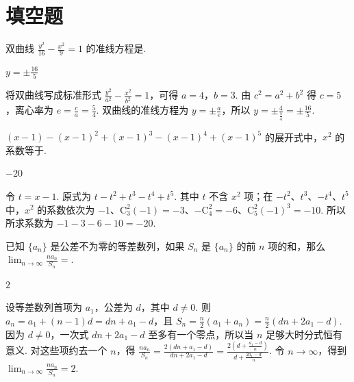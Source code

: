 \section{填空题}

\begin{problem}
双曲线 \(\frac{y^2}{16}-\frac{x^2}{9}=1\) 的准线方程是\fillinblank{}.
\end{problem}

\begin{answer}
\(y=\pm\frac{16}{5}\)
\end{answer}

\begin{solution}
将双曲线写成标准形式 \(\frac{y^2}{a^2}-\frac{x^2}{b^2}=1\)，可得 \(a=4\)，\(b=3\). 由 \(c^2=a^2+b^2\) 得 \(c=5\)，离心率为 \(e=\frac{c}{a}=\frac{5}{4}\). 双曲线的准线方程为 \(y=\pm\frac{a}{e}\)，所以 \(y=\pm\frac{4}{\frac{5}{4}}=\pm\frac{16}{5}\).
\end{solution}

\begin{problem}
\((x-1)-(x-1)^2+(x-1)^3-(x-1)^4+(x-1)^5\) 的展开式中，\(x^2\) 的系数等于\fillinblank{}.
\end{problem}

\begin{answer}
\(-20\)
\end{answer}

\begin{solution}
令 \(t=x-1\). 原式为 \(t-t^2+t^3-t^4+t^5\). 其中 \(t\) 不含 \(x^2\) 项；在 \(-t^2\)、\(t^3\)、\(-t^4\)、\(t^5\) 中，\(x^2\) 的系数依次为 \(-1\)、\(\mathrm C_3^2(-1)=-3\)、\(-\mathrm C_4^2=-6\)、\(\mathrm C_5^2(-1)^3=-10\). 所以所求系数为 \(-1-3-6-10=-20\).
\end{solution}

\begin{problem}
已知 \(\{a_n\}\) 是公差不为零的等差数列，如果 \(S_n\) 是 \(\{a_n\}\) 的前 \(n\) 项的和，那么 \(\displaystyle\lim_{n\to\infty}\frac{na_n}{S_n}=\)\fillinblank{}.
\end{problem}

\begin{answer}
\(2\)
\end{answer}

\begin{solution}
设等差数列首项为 \(a_1\)，公差为 \(d\)，其中 \(d\neq0\). 则 \(a_n=a_1+(n-1)d=dn+a_1-d\)，且 \(S_n=\frac{n}{2}(a_1+a_n)=\frac{n}{2}(dn+2a_1-d)\). 因为 \(d\neq0\)，一次式 \(dn+2a_1-d\) 至多有一个零点，所以当 \(n\) 足够大时分式恒有意义. 对这些项约去一个 \(n\)，得 \(\frac{na_n}{S_n}=\frac{2(dn+a_1-d)}{dn+2a_1-d}=\frac{2\left(d+\frac{a_1-d}{n}\right)}{d+\frac{2a_1-d}{n}}\). 令 \(n\to\infty\)，得到 \(\displaystyle\lim_{n\to\infty}\frac{na_n}{S_n}=2\).
\end{solution}

